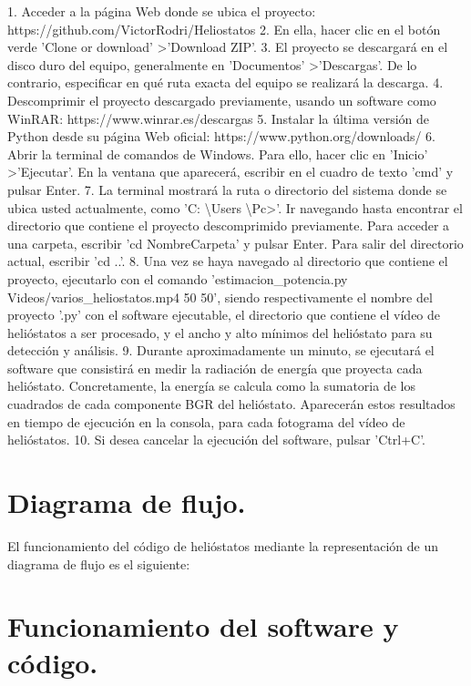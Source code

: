 \documentclass[12pt]{article}
\begin{document}
1. Acceder a la página Web donde se ubica el proyecto: https://github.com/VictorRodri/Heliostatos
2. En ella, hacer clic en el botón verde 'Clone or download' \textgreater 'Download ZIP'.
3. El proyecto se descargará en el disco duro del equipo, generalmente en 'Documentos' \textgreater 'Descargas'. De lo contrario, especificar en qué ruta exacta del equipo se realizará la descarga.
4. Descomprimir el proyecto descargado previamente, usando un software como WinRAR: https://www.winrar.es/descargas
5. Instalar la última versión de Python desde su página Web oficial: https://www.python.org/downloads/
6. Abrir la terminal de comandos de Windows. Para ello, hacer clic en 'Inicio' \textgreater 'Ejecutar'. En la ventana que aparecerá, escribir en el cuadro de texto 'cmd' y pulsar Enter.
7. La terminal mostrará la ruta o directorio del sistema donde se ubica usted actualmente, como 'C: \textbackslash Users \textbackslash Pc\textgreater'. Ir navegando hasta encontrar el directorio que contiene el proyecto descomprimido previamente. Para acceder a una carpeta, escribir 'cd NombreCarpeta' y pulsar Enter. Para salir del directorio actual, escribir 'cd ..'.
8. Una vez se haya navegado al directorio que contiene el proyecto, ejecutarlo con el comando 'estimacion\_potencia.py Videos/varios\_heliostatos.mp4 50 50', siendo respectivamente el nombre del proyecto '.py' con el software ejecutable, el directorio que contiene el vídeo de helióstatos a ser procesado, y el ancho y alto mínimos del helióstato para su detección y análisis.
9. Durante aproximadamente un minuto, se ejecutará el software que consistirá en medir la radiación de energía que proyecta cada helióstato. Concretamente, la energía se calcula como la sumatoria de los cuadrados de cada componente BGR del helióstato. Aparecerán estos resultados en tiempo de ejecución en la consola, para cada fotograma del vídeo de helióstatos.
10. Si desea cancelar la ejecución del software, pulsar 'Ctrl+C'.


\section{Diagrama de flujo.}

El funcionamiento del código de helióstatos mediante la representación de un diagrama de flujo es el siguiente:






 
\section{Funcionamiento del software y código.}
\end{document}
